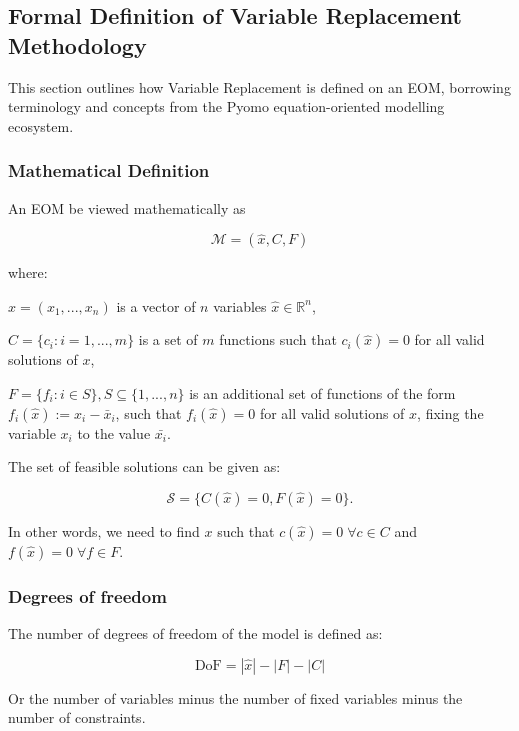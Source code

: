 \hypertarget{formal-definition-of-variable-replacement-methodology}{%
\subsection{Formal Definition of Variable Replacement
Methodology}\label{formal-definition-of-variable-replacement-methodology}}

This section outlines how Variable Replacement is defined on an EOM,
borrowing terminology and concepts from the Pyomo equation-oriented
modelling ecosystem.

\hypertarget{mathematical-definition}{%
\subsubsection{Mathematical Definition}\label{mathematical-definition}}

An EOM be viewed mathematically as

\[
\mathcal{M} = (\hat{x}, C, F)
\]

where:

\(\hat{x} = (x_1,...,x_n )\) is a vector of \(n\) variables
\(\hat{x} \in \mathbb{R}^n\),

\(C = \{c_i: i = 1,...,m\}\) is a set of \(m\) functions such that
\(c_i(\hat{x}) = 0\) for all valid solutions of \(x\),

\(F = \{f_i: i \in S \}, S \subseteq \{1,...,n\}\) is an additional set of
functions of the form \(f_i(\hat{x}):= x_i - \bar{x}_i\), such that
\(f_i(\hat{x}) = 0\) for all valid solutions of \(x\), fixing the
variable \(x_i\) to the value \(\bar{x_i}\).

The set of feasible solutions can be given as:

\[
\mathcal{S} = \{C(\hat{x}) = 0, F(\hat{x}) = 0 \}.
\]

In other words, we need to find \(x\) such that
\(c(\hat{x}) = 0 \; \forall c \in C\) and \(f(\hat{x}) = 0 \; \forall f \in F\).

\hypertarget{degrees-of-freedom}{%
\subsubsection{Degrees of freedom}\label{degrees-of-freedom}}

The number of degrees of freedom of the model is defined as:

\[
\text{DoF} = |\hat{x}| - |F| - |C| 
\]

Or the number of variables minus the number of fixed variables minus the
number of constraints.

